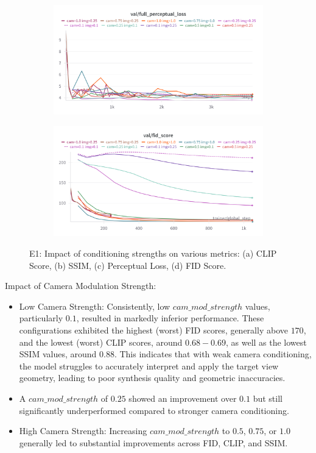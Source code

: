 \begin{figure}[htbp]
  \begin{subfigure}[b]{0.48\textwidth}
    \centering
    \includegraphics[width=\textwidth]{images/experiments/cam_img/perceptual.png}
    \label{fig:exp_cond_perceptual}
  \end{subfigure}
  \hfill
  \begin{subfigure}[b]{0.48\textwidth}
    \centering
    \includegraphics[width=\textwidth]{images/experiments/cam_img/fid.png}
    \label{fig:exp_cond_train_loss}
  \end{subfigure}

  \caption{E1: Impact of conditioning strengths on various metrics: (a) CLIP Score, (b) SSIM, (c) Perceptual Loss, (d) FID Score.}
  \label{fig:exp_cond_metrics_grid}
\end{figure}

Impact of Camera Modulation Strength:
\begin{itemize}
  \item Low Camera Strength: Consistently, low $cam\_mod\_strength$ values, particularly $0.1$, resulted in markedly inferior performance. These configurations exhibited the highest (worst) FID scores, generally above $170$, and the lowest (worst) CLIP scores, around $0.68-0.69$, as well as the lowest SSIM values, around $0.88$. This indicates that with weak camera conditioning, the model struggles to accurately interpret and apply the target view geometry, leading to poor synthesis quality and geometric inaccuracies.
  \item A $cam\_mod\_strength$ of $0.25$ showed an improvement over $0.1$ but still significantly underperformed compared to stronger camera conditioning.
  \item High Camera Strength: Increasing $cam\_mod\_strength$ to $0.5$, $0.75$, or $1.0$ generally led to substantial improvements across FID, CLIP, and SSIM.
\end{itemize}

